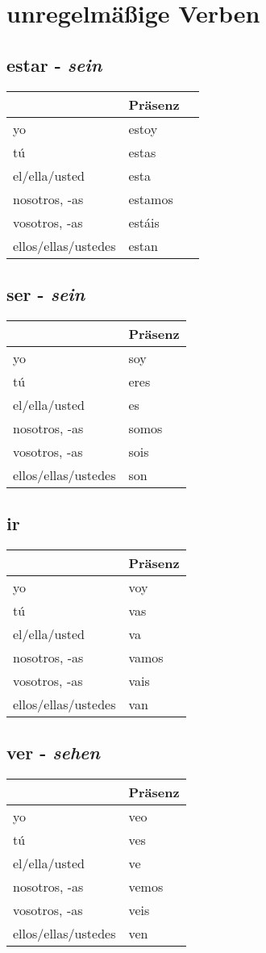 \documentclass{../spanish_summary}
\begin{document}
\chapter*{unregelmäßige Verben}
\section*{estar - \textit{sein}}
\begin{longtable}{p{} | p{}p{}} 
~ & \textbf{Präsenz}\\
\hline
yo & estoy\\
tú & estas\\
el/ella/usted & esta\\
nosotros, -as & estamos\\
vosotros, -as & estáis\\
ellos/ellas/ustedes & estan
\end{longtable}


\section*{ser - \textit{sein}}
\begin{longtable}{p{} | p{}} 
~ & \textbf{Präsenz}\\
\hline
yo & soy\\
tú & eres\\
el/ella/usted & es\\
nosotros, -as & somos\\
vosotros, -as & sois\\
ellos/ellas/ustedes & son
\end{longtable}

\section*{ir}
\begin{longtable}{p{} | p{}} 
~ & \textbf{Präsenz}\\
\hline
yo & voy \\
tú & vas\\
el/ella/usted & va\\
nosotros, -as & vamos \\
vosotros, -as & vais\\
ellos/ellas/ustedes & van\\
\end{longtable}


\section*{ver - \textit{sehen}}
\begin{longtable}{p{} | p{}}
~ & \textbf{Präsenz}\\
\hline
yo & veo\\
tú & ves\\
el/ella/usted & ve\\
nosotros, -as & vemos\\
vosotros, -as & veis \\
ellos/ellas/ustedes & ven
\end{longtable}
\end{document}
